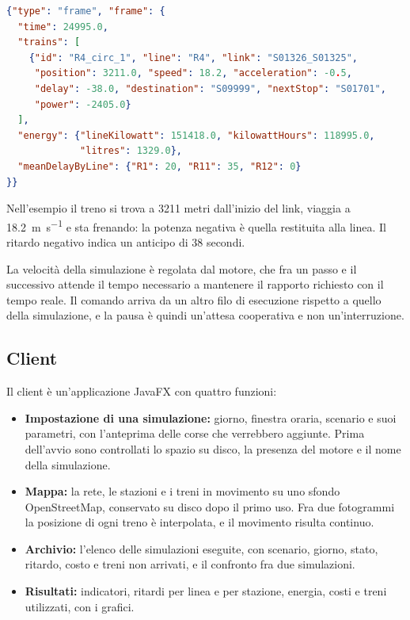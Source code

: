 \begin{lstlisting}[language=json,caption={Un fotogramma della simulazione del giorno feriale, alle 6:56:35, ridotto a un treno.},label={lst:architettura-fotogramma}]
{"type": "frame", "frame": {
  "time": 24995.0,
  "trains": [
    {"id": "R4_circ_1", "line": "R4", "link": "S01326_S01325",
     "position": 3211.0, "speed": 18.2, "acceleration": -0.5,
     "delay": -38.0, "destination": "S09999", "nextStop": "S01701",
     "power": -2405.0}
  ],
  "energy": {"lineKilowatt": 151418.0, "kilowattHours": 118995.0,
             "litres": 1329.0},
  "meanDelayByLine": {"R1": 20, "R11": 35, "R12": 0}
}}
\end{lstlisting}

Nell'esempio il treno si trova a 3211 metri dall'inizio del link, viaggia a \SI{18,2}{\metre\per\second} e sta frenando: la potenza negativa è quella restituita alla linea. Il ritardo negativo indica un anticipo di 38 secondi.

La velocità della simulazione è regolata dal motore, che fra un passo e il successivo attende il tempo necessario a mantenere il rapporto richiesto con il tempo reale. Il comando arriva da un altro filo di esecuzione rispetto a quello della simulazione, e la pausa è quindi un'attesa cooperativa e non un'interruzione.

\subsection{Client}
Il client è un'applicazione JavaFX con quattro funzioni:
\begin{itemize}
	\item \textbf{Impostazione di una simulazione:} giorno, finestra oraria, scenario e suoi parametri, con l'anteprima delle corse che verrebbero aggiunte. Prima dell'avvio sono controllati lo spazio su disco, la presenza del motore e il nome della simulazione.
	\item \textbf{Mappa:} la rete, le stazioni e i treni in movimento su uno sfondo OpenStreetMap, conservato su disco dopo il primo uso. Fra due fotogrammi la posizione di ogni treno è interpolata, e il movimento risulta continuo.
	\item \textbf{Archivio:} l'elenco delle simulazioni eseguite, con scenario, giorno, stato, ritardo, costo e treni non arrivati, e il confronto fra due simulazioni.
	\item \textbf{Risultati:} indicatori, ritardi per linea e per stazione, energia, costi e treni utilizzati, con i grafici.
\end{itemize}

